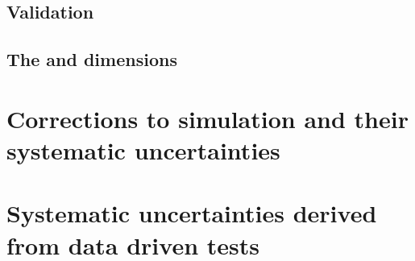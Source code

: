 \subsection{Validation} %

\subsection{The \MHT and \nb dimensions}


\section{Corrections to simulation and their systematic uncertainties}








\section{Systematic uncertainties derived from data driven tests}


